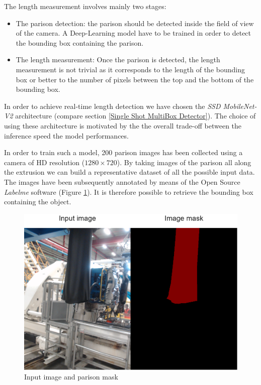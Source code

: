 The length measurement involves mainly two stages:
\begin{itemize}
    \item The parison detection: the parison should be detected inside the field of view of the camera. A Deep-Learning model have to be trained in order to detect the bounding box containing the parison. 
    \item The length measurement: Once the parison is detected, the length measurement is not trivial as it corresponds to the length of the bounding box or better to the number of pixels between the top and the bottom of the bounding box.
\end{itemize}

In order to achieve real-time length detection we have chosen the \textit{SSD MobileNet-V2} architecture (compare section \ref{Single Shot MultiBox Detector}). The choice of using these architecture is motivated by the the overall trade-off between the inference speed the model performances. 

In order to train such a model, 200 parison images has been collected using a camera of HD resolution ($1280\times720$). By taking images of the parison all along the extrusion we can build a representative dataset of all the possible input data. The images have been subsequently annotated by means of the Open Source \textit{Labelme} software \citep{wada2016labelme} (Figure \ref{fig:input_and_label}). It is therefore possible to retrieve the bounding box containing the object.   

\begin{figure}
\centerline{\includegraphics[scale=0.4]{images/chapter_3/input_and_label.png}}
\caption{Input image and parison mask}
\label{fig:input_and_label}
\end{figure}

